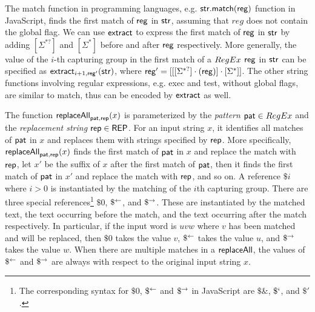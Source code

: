 \begin{remark}
The match function in programming languages, e.g. $\sf str.match(reg)$ function in JavaScript, finds the first match of $\sf reg$ in $\sf str$,  assuming that $reg$ does not contain the global flag. We can use $\mathsf{extract}$ to express the first match of $\sf reg$ in $\sf str$ by adding $[\Sigma^{*?}]$ and $[\Sigma^*]$ before and after $\sf reg$ respectively. More generally, the value of the $i$-th capturing group in the first match of a ${RegEx}$ $\sf reg$ in $\sf str$ can be specified as $\mathsf{extract}_{i+1, {\sf reg'}}({\sf str})$, where ${\sf reg'} = [[[\Sigma^{*?}] \cdot ({\sf reg})] \cdot [\Sigma^*]]$. The other string functions involving regular expressions, e.g. {\sf exec} and {\sf test}, without global flags, are similar to {\sf match}, thus can be encoded by $\mathsf{extract}$ as well.
\end{remark}

The function $\mathsf{replaceAll}_{\mathsf{pat}, \mathsf{rep}}(x)$ is parameterized by the \emph{pattern} $\mathsf{pat} \in {RegEx}$ and the \emph{replacement string} $\mathsf{rep} \in {\sf REP}$.
For an input string $x$, it identifies all matches of $\mathsf{pat}$ in $x$ and replaces them with strings specified by $\mathsf{rep}$. More specifically, $\mathsf{replaceAll}_{\mathsf{pat}, \mathsf{rep}}(x)$ finds the first match of $\mathsf{pat}$ in $x$ and replace the match with $\mathsf{rep}$, let $x'$ be the suffix of $x$ after the first match of $\mathsf{pat}$,  then it finds the first match of $\mathsf{pat}$ in $x'$ and replace the match with $\mathsf{rep}$, and so on.
%
A reference $\$i$ where $i > 0$ is instantiated by the matching of the $i$th capturing group.
There are three special references\footnote{
    The corresponding syntax for $\$0$, $\$^{\leftarrow}$ and $\$^{\rightarrow}$ in JavaScript are $\$\&$, $\$`$, and $\$'$.
} $\$0$, $\$^{\leftarrow}$, and $\$^{\rightarrow}$.
These are instantiated by the matched text, the text occurring before the match, and the text occurring after the match respectively.
In particular, if the input word is $u v w$ where $v$ has been matched and will be replaced, then $\$0$ takes the value $v$, $\$^{\leftarrow}$ takes the value $u$, and $\$^{\rightarrow}$ takes the value $w$.
When there are multiple matches in a $\mathsf{replaceAll}$, the values of $\$^{\leftarrow}$ and $\$^{\rightarrow}$ are always with respect to the original input string $x$.

